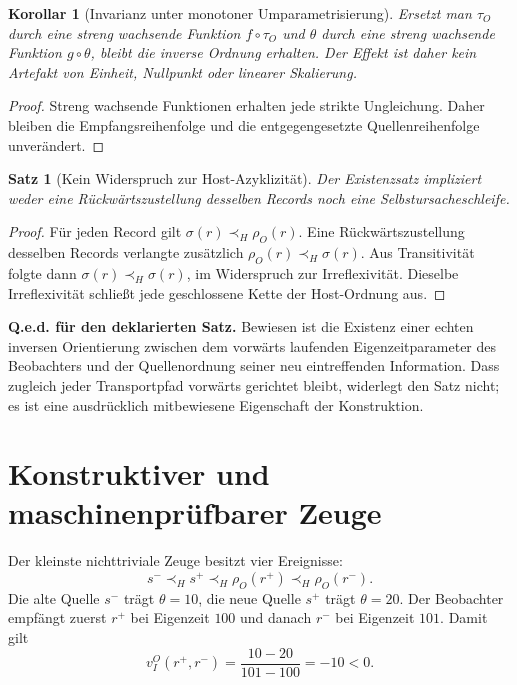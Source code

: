 \documentclass[11pt,a4paper]{article}
\newtheorem{satz}{Satz}[section]
\newtheorem{korollar}{Korollar}[section]
\theoremstyle{remark}
\newcommand{\host}{\prec_{\!H}}
\newcommand{\statusbox}[2]{%
  \par\medskip\noindent
  \colorbox{#1}{\parbox{\dimexpr\linewidth-2\fboxsep\relax}{#2}}%
  \par\medskip
}
\begin{document}
\begin{korollar}[Invarianz unter monotoner Umparametrisierung]
Ersetzt man \(\tau_O\) durch eine streng wachsende Funktion
\(f\!\circ\!\tau_O\) und \(\theta\) durch eine streng wachsende Funktion
\(g\!\circ\!\theta\), bleibt die inverse Ordnung erhalten. Der Effekt ist
daher kein Artefakt von Einheit, Nullpunkt oder linearer Skalierung.
\end{korollar}

\begin{proof}
Streng wachsende Funktionen erhalten jede strikte Ungleichung. Daher bleiben
die Empfangsreihenfolge und die entgegengesetzte Quellenreihenfolge
unverändert.
\end{proof}

\begin{satz}[Kein Widerspruch zur Host-Azyklizität]
\label{thm:no-cycle}
Der Existenzsatz impliziert weder eine Rückwärtszustellung desselben Records
noch eine Selbstursacheschleife.
\end{satz}

\begin{proof}
Für jeden Record gilt \(\sigma(r)\host\rho_O(r)\). Eine Rückwärtszustellung
desselben Records verlangte zusätzlich
\(\rho_O(r)\host\sigma(r)\). Aus Transitivität folgte dann
\(\sigma(r)\host\sigma(r)\), im Widerspruch zur Irreflexivität. Dieselbe
Irreflexivität schließt jede geschlossene Kette der Host-Ordnung aus.
\end{proof}

\statusbox{QGreen}{
  \textbf{Q.e.d. für den deklarierten Satz.}
  Bewiesen ist die Existenz einer echten inversen Orientierung zwischen dem
  vorwärts laufenden Eigenzeitparameter des Beobachters und der
  Quellenordnung seiner neu eintreffenden Information. Dass zugleich jeder
  Transportpfad vorwärts gerichtet bleibt, widerlegt den Satz nicht; es ist
  eine ausdrücklich mitbewiesene Eigenschaft der Konstruktion.
}

\section{Konstruktiver und maschinenprüfbarer Zeuge}
\label{sec:witness}

Der kleinste nichttriviale Zeuge besitzt vier Ereignisse:
\[
  s^-\host s^+\host\rho_O(r^+)\host\rho_O(r^-).
\]
Die alte Quelle \(s^-\) trägt \(\theta=10\), die neue Quelle \(s^+\) trägt
\(\theta=20\). Der Beobachter empfängt zuerst \(r^+\) bei Eigenzeit \(100\)
und danach \(r^-\) bei Eigenzeit \(101\). Damit gilt
\[
  v_I^O(r^+,r^-)=\frac{10-20}{101-100}=-10<0.
\]
\end{document}
